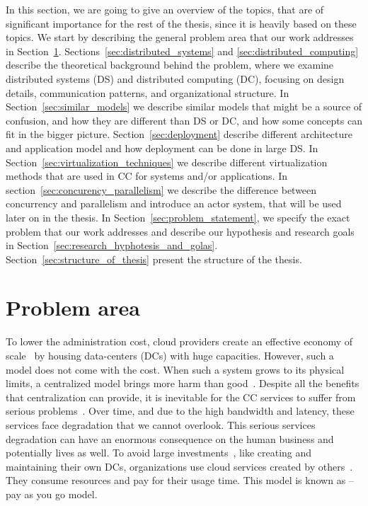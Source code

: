 In this section, we are going to give an overview of the topics, that are of significant importance for the rest of the thesis, since it is heavily based on these topics. We start by describing the general problem area that our work addresses in Section~\ref{sec:problem_area}. Sections~\ref{sec:distributed_systems} and \ref{sec:distributed_computing} describe the theoretical background behind the problem, where we examine distributed systems (DS) and distributed computing (DC), focusing on design details, communication patterns, and organizational structure. In Section~\ref{sec:similar_models} we describe similar models that might be a source of confusion, and how they are different than DS or DC, and how some concepts can fit in the bigger picture. Section~\ref{sec:deployment} describe different architecture and application model and how deployment can be done in large DS. In Section~\ref{sec:virtualization_techniques} we describe different virtualization methods that are used in CC for systems and/or applications. In section~\ref{sec:concurency_parallelism} we describe the difference between concurrency and parallelism and introduce an actor system, that will be used later on in the thesis. In Section~\ref{sec:problem_statement}, we specify the exact problem that our work addresses and describe our hypothesis and research goals in Section~\ref{sec:research_hyphotesis_and_golas}. Section~\ref{sec:structure_of_thesis} present the structure of the thesis.
%
%
%
\section{Problem area}\label{sec:problem_area}
%
To lower the administration cost, cloud providers create an effective economy of scale~\cite{BariBEGPRZZ13} by housing data-centers (DCs) with huge capacities. However, such a model does not come with the cost. When such a  system grows to its physical limits, a centralized model brings more harm than good~\cite{GunawiHSLSAE16, LopezMEDHIBFR15}. Despite all the benefits that centralization can provide, it is inevitable for the CC services to suffer from serious problems~\cite{KarimIWGSYO16}. Over time, and due to the high bandwidth and latency, these services face degradation that we cannot overlook. This serious services degradation can have an enormous consequence on the human business and potentially lives as well. To avoid large investments~\cite{MonsalveCC18}, like creating and maintaining their own DCs, organizations use cloud services created by others~\cite{Satyanarayanan17}. They consume resources and pay for their usage time. This model is known as -- pay as you go model.

